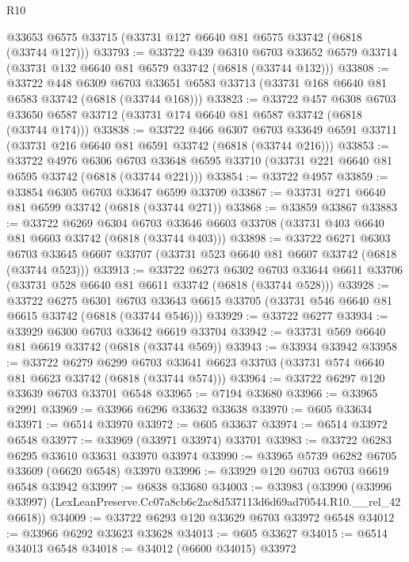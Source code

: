 \begin{lexlean}{R10}
\begin{coremodule}
    @33653
    @6575
    @33715
    (@33731 @127 @6640 @81 @6575 @33742 (@6818 (@33744 @127)))
@33793 := @33722
    @439
    @6310
    @6703
    @33652
    @6579
    @33714
    (@33731 @132 @6640 @81 @6579 @33742 (@6818 (@33744 @132)))
@33808 := @33722
    @448
    @6309
    @6703
    @33651
    @6583
    @33713
    (@33731 @168 @6640 @81 @6583 @33742 (@6818 (@33744 @168)))
@33823 := @33722
    @457
    @6308
    @6703
    @33650
    @6587
    @33712
    (@33731 @174 @6640 @81 @6587 @33742 (@6818 (@33744 @174)))
@33838 := @33722
    @466
    @6307
    @6703
    @33649
    @6591
    @33711
    (@33731 @216 @6640 @81 @6591 @33742 (@6818 (@33744 @216)))
@33853 := @33722
    @4976
    @6306
    @6703
    @33648
    @6595
    @33710
    (@33731 @221 @6640 @81 @6595 @33742 (@6818 (@33744 @221)))
@33854 := @33722 @4957
@33859 := @33854 @6305 @6703 @33647 @6599 @33709
@33867 := @33731 @271 @6640 @81 @6599 @33742 (@6818 (@33744 @271))
@33868 := @33859 @33867
@33883 := @33722
    @6269
    @6304
    @6703
    @33646
    @6603
    @33708
    (@33731 @403 @6640 @81 @6603 @33742 (@6818 (@33744 @403)))
@33898 := @33722
    @6271
    @6303
    @6703
    @33645
    @6607
    @33707
    (@33731 @523 @6640 @81 @6607 @33742 (@6818 (@33744 @523)))
@33913 := @33722
    @6273
    @6302
    @6703
    @33644
    @6611
    @33706
    (@33731 @528 @6640 @81 @6611 @33742 (@6818 (@33744 @528)))
@33928 := @33722
    @6275
    @6301
    @6703
    @33643
    @6615
    @33705
    (@33731 @546 @6640 @81 @6615 @33742 (@6818 (@33744 @546)))
@33929 := @33722 @6277
@33934 := @33929 @6300 @6703 @33642 @6619 @33704
@33942 := @33731 @569 @6640 @81 @6619 @33742 (@6818 (@33744 @569))
@33943 := @33934 @33942
@33958 := @33722
    @6279
    @6299
    @6703
    @33641
    @6623
    @33703
    (@33731 @574 @6640 @81 @6623 @33742 (@6818 (@33744 @574)))
@33964 := @33722 @6297 @120 @33639 @6703 @33701 @6548
@33965 := @7194 @33680
@33966 := @33965 @2991
@33969 := @33966 @6296 @33632 @33638
@33970 := @605 @33634
@33971 := @6514 @33970
@33972 := @605 @33637
@33974 := @6514 @33972 @6548
@33977 := @33969 (@33971 @33974) @33701
@33983 := @33722 @6283 @6295 @33610 @33631 @33970 @33974
@33990 := @33965 @5739 @6282 @6705 @33609 (@6620 @6548) @33970
@33996 := @33929 @120 @6703 @6703 @6619 @6548 @33942
@33997 := @6838 @33680
@34003 := @33983
    (@33990 (@33996 @33997) (LexLeanPreserve.Cc07a8cb6c2ac8d537113d6d69ad70544.R10.__rel_42 @6618))
@34009 := @33722 @6293 @120 @33629 @6703 @33972 @6548
@34012 := @33966 @6292 @33623 @33628
@34013 := @605 @33627
@34015 := @6514 @34013 @6548
@34018 := @34012 (@6600 @34015) @33972

\end{coremodule}
\end{lexlean}
